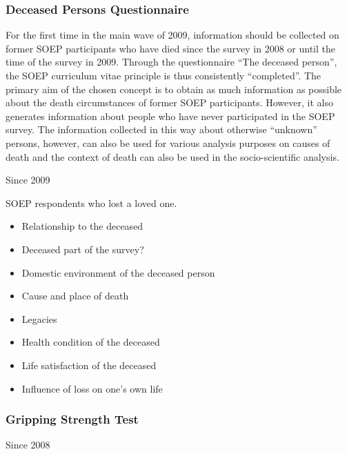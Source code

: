 \documentclass[letterpaper,10pt,openany,onesideH,english]{sphinxmanual}
\begin{document}
\subsubsection{Deceased Persons Questionnaire}
\label{\detokenize{Contents of SOEPcore/index:deceased-persons-questionnaire}}\label{\detokenize{Contents of SOEPcore/index:id28}}
For the first time in the main wave of 2009, information should be collected on former SOEP participants who have died since the survey in 2008 or until the time of the survey in 2009. Through the questionnaire “The deceased person”, the SOEP curriculum vitae principle is thus consistently “completed”. The primary aim of the chosen concept is to obtain as much information as possible about the death circumstances of former SOEP participants. However, it also generates information about people who have never participated in the SOEP survey. The information collected in this way about otherwise “unknown” persons, however, can also be used for various analysis purposes on causes of death and the context of death can also be used in the socio-scientific analysis.

 Since 2009

 SOEP respondents who lost a loved one.

\begin{itemize}
\item {} 
Relationship to the deceased

\item {} 
Deceased part of the survey?

\item {} 
Domestic environment of the deceased person

\item {} 
Cause and place of death

\item {} 
Legacies

\item {} 
Health condition of the deceased

\item {} 
Life satisfaction of the deceased

\item {} 
Influence of loss on one’s own life

\end{itemize}


\subsubsection{Gripping Strength Test}
\label{\detokenize{Contents of SOEPcore/index:gripping-strength-test}}
 Since 2008
\end{document}
